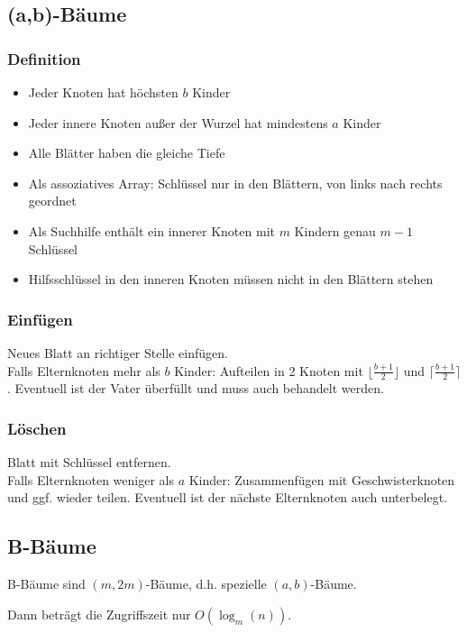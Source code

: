 \documentclass[11pt]{scrartcl}
\begin{document}
\subsection{(a,b)-Bäume}

\subsubsection{Definition}
\begin{itemize}
	\item Jeder Knoten hat höchsten $b$ Kinder
    \item Jeder innere Knoten außer der Wurzel hat mindestens $a$ Kinder
    \item Alle Blätter haben die gleiche Tiefe
    \item Als assoziatives Array: Schlüssel nur in den Blättern, von links nach rechts geordnet
    \item Als Suchhilfe enthält ein innerer Knoten mit $m$ Kindern genau $m − 1$ Schlüssel
    \item Hilfsschlüssel in den inneren Knoten müssen nicht in den Blättern stehen
\end{itemize}

\subsubsection{Einfügen}
Neues Blatt an richtiger Stelle einfügen. \\
Falls Elternknoten mehr als $b$ Kinder: Aufteilen in 2 Knoten mit $\lfloor \frac{b+1}{2} \rfloor$ und $\lceil \frac{b+1}{2} \rceil$. Eventuell ist der Vater überfüllt und muss auch behandelt werden.

\subsubsection{Löschen}
Blatt mit Schlüssel entfernen. \\
Falls Elternknoten weniger als $a$ Kinder: Zusammenfügen mit Geschwisterknoten und ggf. wieder teilen. Eventuell ist der nächste Elternknoten auch unterbelegt.

\subsection{B-Bäume}

B-Bäume sind $(m, 2m)$-Bäume, d.h. spezielle $(a,b)$-Bäume.

Dann beträgt die Zugriffszeit nur $O(\log_m(n))$.
\end{document}
